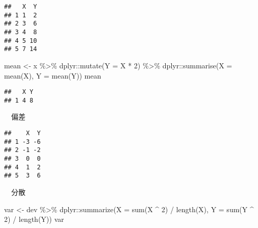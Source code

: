 \documentclass[
  12pt,
]{book}
\newenvironment{Shaded}{\begin{snugshade}}{\end{snugshade}}
\newcommand{\AttributeTok}[1]{\textcolor[rgb]{0.77,0.63,0.00}{#1}}
\newcommand{\DecValTok}[1]{\textcolor[rgb]{0.00,0.00,0.81}{#1}}
\newcommand{\FunctionTok}[1]{\textcolor[rgb]{0.00,0.00,0.00}{#1}}
\newcommand{\NormalTok}[1]{#1}
\newcommand{\OtherTok}[1]{\textcolor[rgb]{0.56,0.35,0.01}{#1}}
\newcommand{\SpecialCharTok}[1]{\textcolor[rgb]{0.00,0.00,0.00}{#1}}
\begin{document}
\begin{verbatim}
##   X  Y
## 1 1  2
## 2 3  6
## 3 4  8
## 4 5 10
## 5 7 14
\end{verbatim}

\begin{Shaded}
\begin{Highlighting}[]
\NormalTok{mean }\OtherTok{\textless{}{-}}\NormalTok{ x }\SpecialCharTok{\%\textgreater{}\%} 
\NormalTok{  dplyr}\SpecialCharTok{::}\FunctionTok{mutate}\NormalTok{(}\AttributeTok{Y =}\NormalTok{ X }\SpecialCharTok{*} \DecValTok{2}\NormalTok{) }\SpecialCharTok{\%\textgreater{}\%} 
\NormalTok{  dplyr}\SpecialCharTok{::}\FunctionTok{summarise}\NormalTok{(}\AttributeTok{X =} \FunctionTok{mean}\NormalTok{(X), }\AttributeTok{Y =} \FunctionTok{mean}\NormalTok{(Y))}
\NormalTok{mean}
\end{Highlighting}
\end{Shaded}

\begin{verbatim}
##   X Y
## 1 4 8
\end{verbatim}

　偏差

\begin{Shaded}
\end{Shaded}

\begin{verbatim}
##    X  Y
## 1 -3 -6
## 2 -1 -2
## 3  0  0
## 4  1  2
## 5  3  6
\end{verbatim}

　分散

\begin{Shaded}
\begin{Highlighting}[]
\NormalTok{var }\OtherTok{\textless{}{-}}\NormalTok{ dev }\SpecialCharTok{\%\textgreater{}\%} 
\NormalTok{  dplyr}\SpecialCharTok{::}\FunctionTok{summarize}\NormalTok{(}\AttributeTok{X =} \FunctionTok{sum}\NormalTok{(X }\SpecialCharTok{\^{}} \DecValTok{2}\NormalTok{) }\SpecialCharTok{/} \FunctionTok{length}\NormalTok{(X), }\AttributeTok{Y =} \FunctionTok{sum}\NormalTok{(Y }\SpecialCharTok{\^{}} \DecValTok{2}\NormalTok{) }\SpecialCharTok{/} \FunctionTok{length}\NormalTok{(Y))}
\NormalTok{var}
\end{Highlighting}
\end{Shaded}
\end{document}
